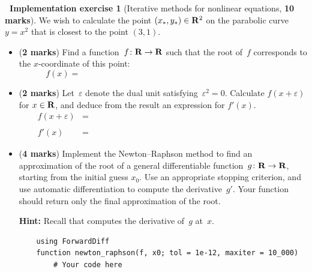\documentclass[10pt]{article}
\theoremstyle{definition}
\newtheorem{compexercise}{{\normalfont \faLaptop}~Implementation exercise}
\renewcommand{\mymarks}[1]{\textbf{#1 marks}}
\begin{document}
\newpage
\begin{compexercise}
    [Iterative methods for nonlinear equations, \mymarks{10}]
    We wish to calculate the point $(x_*, y_*) \in \mathbf R^2$ on the parabolic curve $y = x^2$ that is closest to the point $(3, 1)$.
    \begin{itemize}
        \item
            (\mymarks{2})
            Find a function~$f \colon \mathbf R \to \mathbf R$ such that the root of~$f$ corresponds to the $x$-coordinate of this point:
            \[
                f(x) = \hspace{10cm}
            \]

        \item
            (\mymarks{2})
            Let~$\varepsilon$ denote the dual unit satisfying~$\varepsilon^2 = 0$.
            Calculate $f(x + \varepsilon)$ for $x \in \mathbf R$,
            and deduce from the result an expression for $f'(x)$.
            \begin{align*}
                f(x + \varepsilon) &= \hspace{10cm} \\
                \\
                f'(x) &= \hspace{10cm}
            \end{align*}

        \item
            (\mymarks{4})
            Implement the Newton--Raphson method to find an approximation of the root of a general differentiable function~$g \colon \mathbf R \to \mathbf R$,
            starting from the initial guess $x_0$.
            Use an appropriate stopping criterion, and use automatic differentiation to compute the derivative~$g'$.
            Your function should return only the final approximation of the root.

            \textbf{Hint:}
            Recall that  computes the derivative of~$g$ at~$x$.
            \begin{verbatim}
    using ForwardDiff
    function newton_raphson(f, x0; tol = 1e-12, maxiter = 10_000)
        # Your code here


















\end{verbatim}
\end{itemize}
\end{compexercise}
\end{document}
